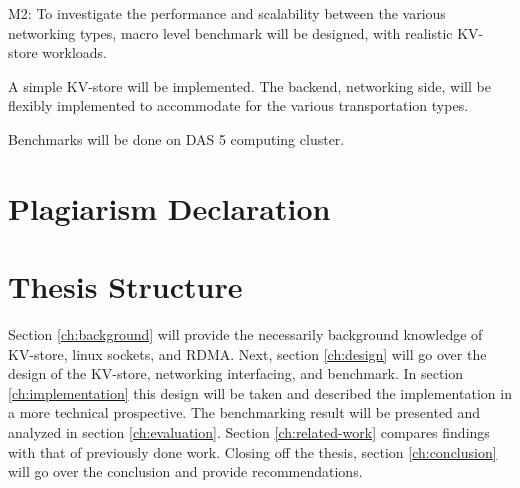 M2: To investigate the performance and scalability between the various networking types, macro level benchmark will be designed, with realistic KV-store workloads.

A simple KV-store will be implemented.
The backend, networking side, will be flexibly implemented to accommodate for the various transportation types.
 
Benchmarks will be done on DAS 5 computing cluster.

\section{Plagiarism Declaration}

\section{Thesis Structure}
Section \ref{ch:background} will provide the necessarily background knowledge of KV-store, linux sockets, and RDMA.
Next, section \ref{ch:design} will go over the design of the KV-store, networking interfacing, and benchmark.
In section \ref{ch:implementation} this design will be taken and described the implementation in a more technical prospective.
The benchmarking result will be presented and analyzed in section \ref{ch:evaluation}.
Section \ref{ch:related-work} compares findings with that of previously done work.
Closing off the thesis, section \ref{ch:conclusion} will go over the conclusion and provide recommendations.